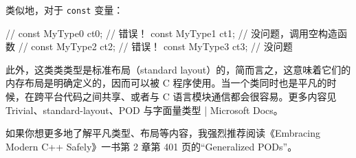 类似地，对于 \texttt{const} 变量：

\begin{codebox}[cpp]
// const MyType0 ct0; // 错误！
const MyType1 ct1; // 没问题，调用空构造函数
// const MyType2 ct2; // 错误！
const MyType3 ct3; // 没问题
\end{codebox}

\begin{myInfoBox}
此外，这类类类型是标准布局（standard layout）的，简而言之，这意味着它们的内存布局是明确定义的，因而可以被 C 程序使用。当一个类同时也是平凡的时候，在跨平台代码之间共享、或者与 C 语言模块通信都会很容易。更多内容见 Trivial、standard-layout、POD 与字面量类型 | Microsoft Docs。
\end{myInfoBox}

\begin{myInfoBox}
如果你想更多地了解平凡类型、布局等内容，我强烈推荐阅读《Embracing Modern C++ Safely》一书第 2 章第 401 页的“Generalized PODs”。
\end{myInfoBox}


